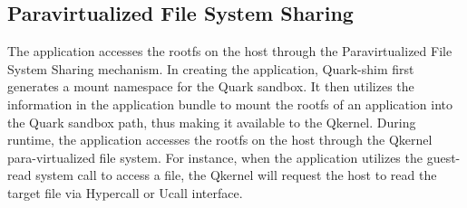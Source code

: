 
\subsection{Paravirtualized File System Sharing}
The application accesses the rootfs on the host through the Paravirtualized File System Sharing mechanism. In creating the application, Quark-shim first generates a mount namespace for the Quark sandbox. It then utilizes the information in the application bundle to mount the rootfs of an application 
into the Quark sandbox path, thus making it available to the Qkernel. During runtime, the application accesses the rootfs on the host through the Qkernel para-virtualized file system. For instance, when the application utilizes the guest-read system call to access a file, the Qkernel will request 
the host to read the target file via Hypercall or Ucall interface. 


